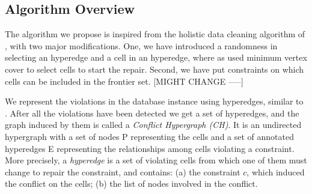 %
%
%

\subsection{Algorithm Overview}
The algorithm we propose is inspired from the holistic data cleaning algorithm of \cite{XuChu}, with two major modifications.
One, we have introduced a randomness in selecting an hyperedge and a cell in an hyperedge, where as \cite{XuChu} used minimum vertex cover to select cells to start the repair.
Second, we have put constraints on which cells can be included in the frontier set. [MIGHT CHANGE -----]

We represent the violations in the database instance using hyperedges, similar to \cite{XuChu,Kolahi}.
After all the violations have been detected we get a set of hyperedges, and the graph induced by them is called a \textit{Conflict Hypergraph (CH)}.
It is an undirected hypergraph with a set of nodes P representing the cells and a set of annotated hyperedges E representing the relationships among cells violating a constraint.
More precisely, a \textit{hyperedge} is a set of violating cells from which one of them must change to repair the constraint, and contains: 
(a) the constraint $c$, which induced the conflict on the cells; (b) the list of nodes involved in the conflict.

